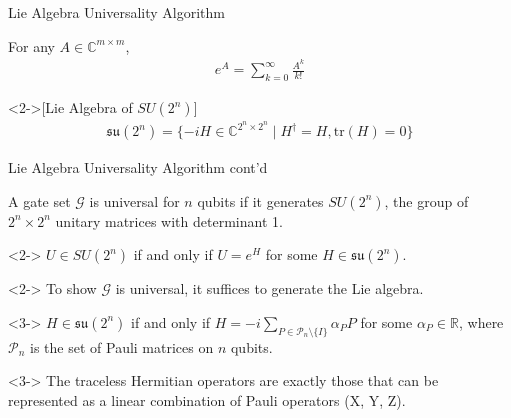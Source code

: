 \begin{frame}{Lie Algebra Universality Algorithm}

\begin{definition}
For any $A \in \mathbb{C}^{m \times m}$, 
\begin{align}
    e^A = \sum_{k=0}^\infty \frac{A^k}{k!}
\end{align}
\end{definition}

\begin{definition}<2->[Lie Algebra of $SU(2^n)$]
\begin{align}
    \mathfrak{su}(2^n) = \{ -iH \in \mathbb{C}^{2^n \times 2^n} \mid H^\dagger = H, \text{tr}(H) = 0 \}
\end{align}
\end{definition}

\end{frame}

\begin{frame}{Lie Algebra Universality Algorithm cont'd}

\begin{theorem}
A gate set $\mathcal{G}$ is universal for $n$ qubits if it generates $SU(2^n)$, the group of $2^n \times 2^n$ unitary matrices with determinant 1.
\end{theorem}

\begin{fact}<2->
$U \in SU(2^n)$ if and only if $U = e^{H}$ for some $H \in \mathfrak{su}(2^n)$.
\end{fact}

\begin{corollary}<2->
To show $\mathcal{G}$ is universal, it suffices to generate the Lie algebra.
\end{corollary}

\begin{fact}<3->
$H \in \mathfrak{su}(2^n)$ if and only if $H = -i \sum_{P \in \mathcal{P}_n \setminus \{I\}} \alpha_P P$ for some $\alpha_P \in \mathbb{R}$, where $\mathcal{P}_n$ is the set of Pauli matrices on $n$ qubits.
\end{fact}

\begin{corollary}<3->
The traceless Hermitian operators are exactly those that can be represented as a linear combination of Pauli operators (X, Y, Z).
\end{corollary}

\end{frame}

